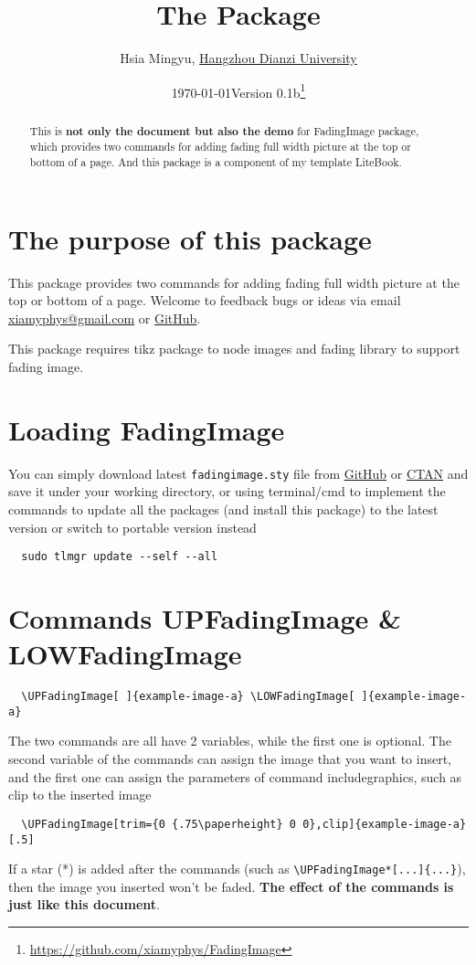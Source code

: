 \documentclass[11pt]{article}
\title{\bfseries The \pkg{FadingImage} Package}
\author{Hsia Mingyu, \href{https://www.hdu.edu.cn}{Hangzhou Dianzi University}}
\affil{\href{mailto:xiamyphys@gmail.com}{\ttfamily xiamyphys@gmail.com}}
\date{\today\quad Version 0.1b\thanks{\url{https://github.com/xiamyphys/FadingImage}}}
\def\pkg#1{\texorpdfstring{\textcolor{pkgcolor}{\textsf{#1}}}{“#1”}}
\def\cmd#1{\texorpdfstring{\textcolor{cmdcolor}{\textsf{#1}}}{“#1”}}
\begin{document}
\maketitle
{}

\vspace{-6ex}
\begin{abstract}
This is \textsf{\textbf{not only the document but also the demo}} for \pkg{FadingImage} package, which provides two commands for adding fading full width picture at the top or bottom of a page. And this package is a component of my template \pkg{LiteBook}.
\end{abstract}

\section{The purpose of this package}
This package provides two commands for adding fading full width picture at the top or bottom of a page. Welcome to feedback bugs or ideas via email \href{mailto:xiamyphys@gmail.com}{\ttfamily xiamyphys@gmail.com} or \href{https://github.com/xiamyphys/fadingimage}{GitHub}.

This package requires \pkg{tikz} package to node images and \pkg{fading} library to support fading image.

\section{Loading \pkg{FadingImage}}
You can simply download latest \verb|fadingimage.sty| file from \href{https://github.com/xiamyphys/FadingImage}{GitHub} or \href{https://ctan.org/pkg/fadingimage}{CTAN} and save it under your working directory, or using terminal/cmd to implement the commands to update all the packages (and install this package) to the latest version or switch to portable version instead
\begin{verbatim}
  sudo tlmgr update --self --all
\end{verbatim}

\section{Commands \cmd{UPFadingImage} \& \cmd{LOWFadingImage}}
\begin{verbatim}
  \UPFadingImage[ ]{example-image-a} \LOWFadingImage[ ]{example-image-a}
\end{verbatim}

The two commands are all have 2 variables, while the first one is optional. The second variable of the commands can assign the image that you want to insert, and the first one can assign the parameters of command \cmd{includegraphics}, such as clip to the inserted image
\begin{verbatim}
  \UPFadingImage[trim={0 {.75\paperheight} 0 0},clip]{example-image-a}[.5]
\end{verbatim}

If a star (*) is added after the commands (such as \verb|\UPFadingImage*[...]{...}|), then the image you inserted won't be faded. \textbf{\textsf{The effect of the commands is just like this document}}.
\end{document}
